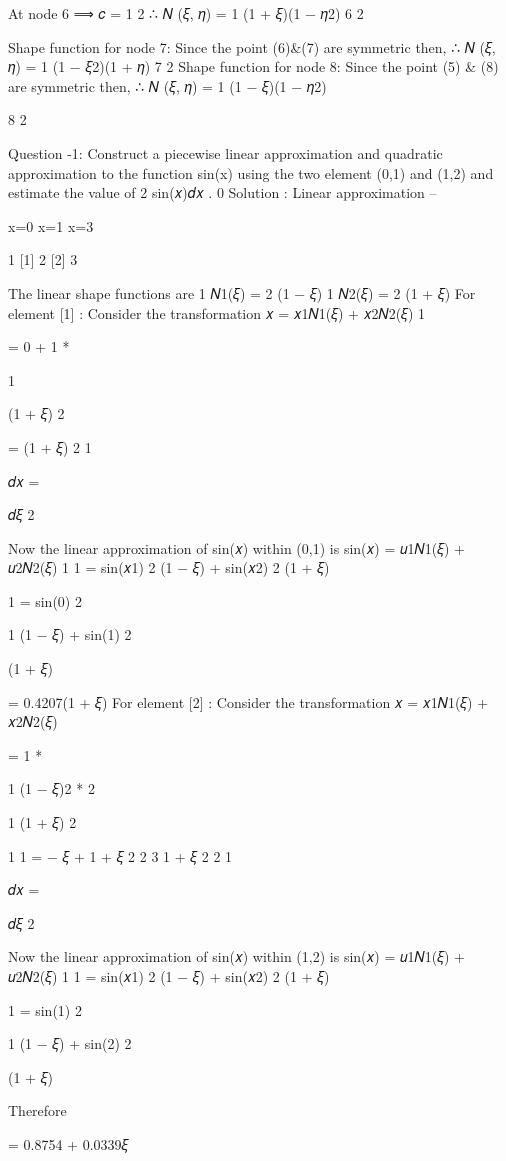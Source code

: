 {{{{{{At node 6	⟹ 𝑐 = 1 2
∴ 𝑁 (𝜉, 𝜂) = 1 (1 + 𝜉)(1 − 𝜂2)
6	2

Shape function for node 7:
Since the point (6)&(7) are symmetric then,
∴ 𝑁 (𝜉, 𝜂) = 1 (1 − 𝜉2)(1 + 𝜂)
7	2
Shape function for node 8:
Since the point (5) & (8) are symmetric then,
∴ 𝑁 (𝜉, 𝜂) = 1 (1 − 𝜉)(1 − 𝜂2)
 
8	2
 
Question -1: Construct a piecewise linear approximation and quadratic approximation to the
function sin(x) using the two element (0,1) and (1,2) and estimate the value of	2 sin(𝑥)𝑑𝑥 .
0
Solution : Linear approximation –



x=0
	x=1
	x=3

1	[1]	2	[2]	3


The linear shape functions are
1
𝑁1(𝜉) = 2 (1 − 𝜉)
1
𝑁2(𝜉) = 2 (1 + 𝜉)
For element [1] : Consider the transformation
𝑥 = 𝑥1𝑁1(𝜉) + 𝑥2𝑁2(𝜉)
1
 
= 0 + 1 *

1
 
  (1 + 𝜉)
2
 
=   (1 + 𝜉) 2
1
 
𝑑𝑥 =
 
  𝑑𝜉 2
 
Now the linear approximation of sin(𝑥) within (0,1) is
sin(𝑥) = 𝑢1𝑁1(𝜉) + 𝑢2𝑁2(𝜉)
1	1
= sin(𝑥1) 2 (1 − 𝜉) + sin(𝑥2) 2 (1 + 𝜉)
 
1
= sin(0)  
2
 
1
(1 − 𝜉) + sin(1)  
2
 

(1 + 𝜉)
 
= 0.4207(1 + 𝜉)
For element [2] : Consider the transformation
𝑥 = 𝑥1𝑁1(𝜉) + 𝑥2𝑁2(𝜉)
 
= 1 *
 
1
  (1 − 𝜉)2 * 2
 
1
  (1 + 𝜉)
2
 
1	1
=   −   𝜉 + 1 + 𝜉
2	2
3	1
  +   𝜉
2	2
1
 
𝑑𝑥 =
 
  𝑑𝜉 2
 
Now the linear approximation of sin(𝑥) within (1,2) is
sin(𝑥) = 𝑢1𝑁1(𝜉) + 𝑢2𝑁2(𝜉)
1	1
= sin(𝑥1) 2 (1 − 𝜉) + sin(𝑥2) 2 (1 + 𝜉)
 
1
= sin(1)  
2
 
1
(1 − 𝜉) + sin(2)  
2
 

(1 + 𝜉)
 

 


Therefore
 
= 0.8754 + 0.0339𝜉
 
}}}}}}
